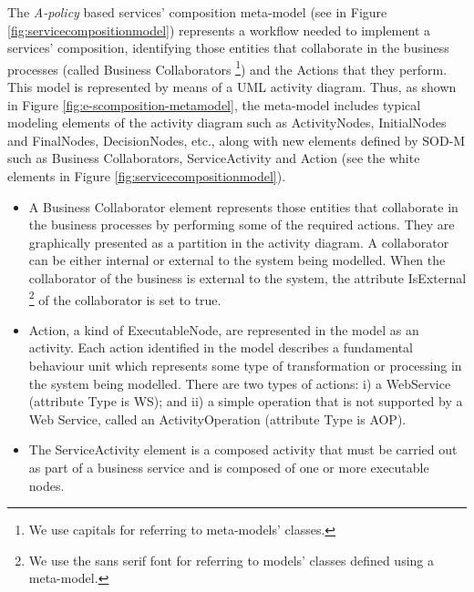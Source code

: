 

The {\em A-policy} based services' composition meta-model (see  in Figure \ref{fig:servicecompositionmodel})
represents  a workflow needed to implement a services' composition, identifying those entities that collaborate in the business processes (called {\sc Business Collaborators} \footnote{We use {\sc capitals} for referring to meta-models' classes.}) and the {\sc Actions} that  they perform. This model is represented by means of a UML activity diagram. Thus, as shown in Figure \ref{fig:e-scomposition-metamodel}, the meta-model includes typical modeling elements of the activity diagram such as {\sc ActivityNodes}, {\sc InitialNodes} and {\sc FinalNodes}, {\sc DecisionNodes}, etc., along with new elements defined by SOD-M such as {\sc Business Collaborators}, {\sc ServiceActivity} and {\sc Action} (see the white  elements   in Figure \ref{fig:servicecompositionmodel}).

\begin{itemize}
\item A {\sc Business Collaborator} element represents those entities that collaborate in the business processes by performing some of the required actions. They are graphically presented as a partition in the activity diagram. A collaborator can be either internal or external to the system being modelled. When the collaborator of the business is external to the system, the attribute {\sf\small IsExternal} \footnote{We use the {\sf sans serif} font for referring to models' classes defined using a meta-model.} of the collaborator is set to true.

\item {\sc Action}, a kind of {\sc ExecutableNode}, are represented in the model as an activity. Each action identified in the model describes a fundamental behaviour unit which represents some type of transformation or processing in the system being modelled. There are two types of actions: i) a WebService (attribute Type is {\sf\small WS}); and ii) a simple operation that is not supported by a Web Service, called an {\sc ActivityOperation} (attribute Type is {\sc AOP}).
    
\item The {\sc ServiceActivity} element is a composed activity that  must be carried out as part of a business service and is composed of one or more executable nodes.
\end{itemize}

